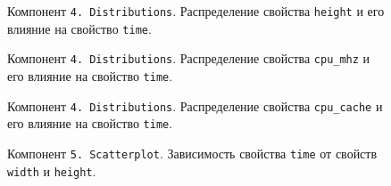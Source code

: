 \begin{figure}[H]
    \caption{Компонент \texttt{4. Distributions}. Распределение свойства \texttt{height} и его влияние на свойство \texttt{time}.}
    \label{img:4-Distributions-height}
\end{figure}

\begin{figure}[H]
    \caption{Компонент \texttt{4. Distributions}. Распределение свойства \texttt{cpu_mhz} и его влияние на свойство \texttt{time}.}
    \label{img:4-Distributions-cpu_mhz}
\end{figure}

\begin{figure}[H]
    \caption{Компонент \texttt{4. Distributions}. Распределение свойства \texttt{cpu_cache} и его влияние на свойство \texttt{time}.}
    \label{img:4-Distributions-cpu_cache}
\end{figure}

\begin{figure}[H]
    \caption{Компонент \texttt{5. Scatterplot}. Зависимость свойства \texttt{time} от свойств \texttt{width} и \texttt{height}.}
    \label{img:5-Scatterplot}
\end{figure}